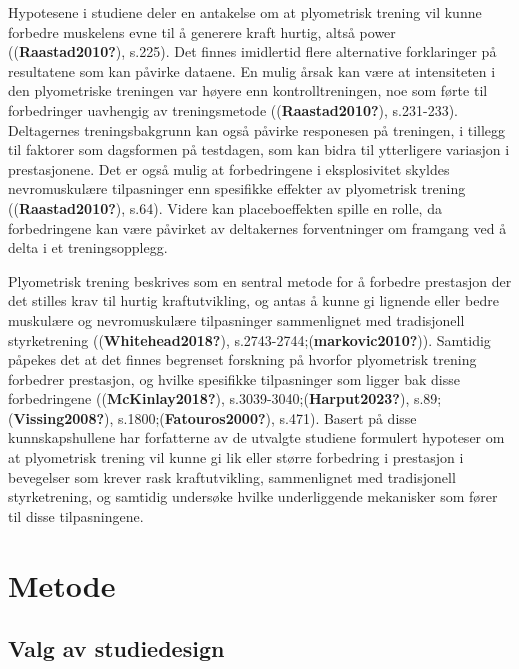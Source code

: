 \documentclass[
  letterpaper,
  DIV=11,
  numbers=noendperiod]{scrreprt}
\begin{document}
Hypotesene i studiene deler en antakelse om at plyometrisk trening vil
kunne forbedre muskelens evne til å generere kraft hurtig, altså power
((\textbf{Raastad2010?}), s.225). Det finnes imidlertid flere
alternative forklaringer på resultatene som kan påvirke dataene. En
mulig årsak kan være at intensiteten i den plyometriske treningen var
høyere enn kontrolltreningen, noe som førte til forbedringer uavhengig
av treningsmetode ((\textbf{Raastad2010?}), s.231-233). Deltagernes
treningsbakgrunn kan også påvirke responesen på treningen, i tillegg til
faktorer som dagsformen på testdagen, som kan bidra til ytterligere
variasjon i prestasjonene. Det er også mulig at forbedringene i
eksplosivitet skyldes nevromuskulære tilpasninger enn spesifikke
effekter av plyometrisk trening ((\textbf{Raastad2010?}), s.64). Videre
kan placeboeffekten spille en rolle, da forbedringene kan være påvirket
av deltakernes forventninger om framgang ved å delta i et
treningsopplegg.

Plyometrisk trening beskrives som en sentral metode for å forbedre
prestasjon der det stilles krav til hurtig kraftutvikling, og antas å
kunne gi lignende eller bedre muskulære og nevromuskulære tilpasninger
sammenlignet med tradisjonell styrketrening ((\textbf{Whitehead2018?}),
s.2743-2744;(\textbf{markovic2010?})). Samtidig påpekes det at det
finnes begrenset forskning på hvorfor plyometrisk trening forbedrer
prestasjon, og hvilke spesifikke tilpasninger som ligger bak disse
forbedringene ((\textbf{McKinlay2018?}),
s.3039-3040;(\textbf{Harput2023?}), s.89;(\textbf{Vissing2008?}),
s.1800;(\textbf{Fatouros2000?}), s.471). Basert på disse
kunnskapshullene har forfatterne av de utvalgte studiene formulert
hypoteser om at plyometrisk trening vil kunne gi lik eller større
forbedring i prestasjon i bevegelser som krever rask kraftutvikling,
sammenlignet med tradisjonell styrketrening, og samtidig undersøke
hvilke underliggende mekanisker som fører til disse tilpasningene.

\section{Metode}\label{metode-4}

\subsection{Valg av studiedesign}\label{valg-av-studiedesign}
\end{document}
